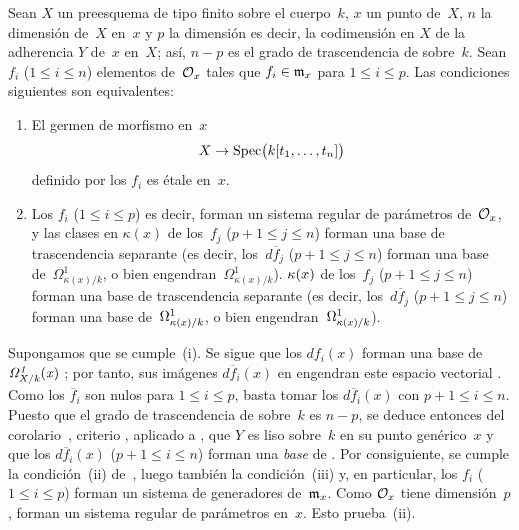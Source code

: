 \begin{corollaire}
\label{II.5.8}
Sean $X$ un preesquema de tipo finito sobre el cuerpo~$k$, $x$ un punto de~$X$, $n$ la dimensión de~$X$ en~$x$ y $p$ la dimensión
es decir, la codimensión en $X$ de la adherencia $Y$ de~$x$ en~$X$; así, $n-p$ es el grado de trascendencia de
sobre~$k$. Sean $f_i$ ($1\leq i\leq n$) elementos de~$\cal{O}_x$ tales que $f_i\in\goth{m}_x$ para $1\leq i\leq p$. Las condiciones siguientes son equivalentes:
\begin{enumerate}
\item[(i)] El germen de morfismo en~$x$
\[
X\to\Spec\bigl(k[t_1,\dots,t_n]\bigr)
\]
definido por los $f_i$ es étale en~$x$.
\item[(ii)] Los $f_i$ ($1\leq i\leq p$)
es decir, forman un sistema regular de parámetros de~$\cal{O}_x$, y las clases en
{$\kappa(x)$ de los~$f_j$ ($p+1\leq j\leq n$) forman una base de trascendencia separante (es decir, los~$d\overline{f}_j$ ($p+1\leq j\leq n$) forman una base de~$\Omega^1_{\kappa(x)/k}$, o bien engendran~$\Omega^1_{\kappa(x)/k}$).}
{$\kres(x)$ de los~$f_j$ ($p+1\leq j\leq n$) forman una base de trascendencia separante (es decir, los~$d\overline{f}_j$ ($p+1\leq j\leq n$) forman una base de~$\Omega^1_{\kres(x)/k}$, o bien engendran~$\Omega^1_{\kres(x)/k}$).}
\end{enumerate}
\end{corollaire}

Supongamos que se cumple~(i). Se sigue que los $df_i(x)$ forman una base de~$\it{\Omega}^1_{X/k}(x)$
;
por tanto, sus imágenes $d\overline{f}_i(x)$ en
engendran este espacio vectorial
.
Como los $\overline{f}_i$ son nulos para $1\leq i\leq p$, basta tomar los $d\overline{f}_i(x)$ con $p+1\leq i\leq n$. Puesto que el grado de trascendencia de
sobre~$k$ es $n-p$, se deduce entonces del corolario~, criterio
,
aplicado a
,
que $Y$ es liso sobre~$k$ en su punto genérico~$x$ y que los $d\overline{f}_i(x)$ ($p+1\leq i\leq n$) forman una \emph{base} de
.
Por consiguiente, se cumple la condición~(ii) de~, luego también la condición~(iii) y, en particular, los $f_i$ ($1\leq i\leq p$) forman un sistema de generadores de~$\goth{m}_x$. Como
$\cal{O}_x$ tiene dimensión~$p$, forman un sistema regular de parámetros en~$x$. Esto prueba~(ii).

